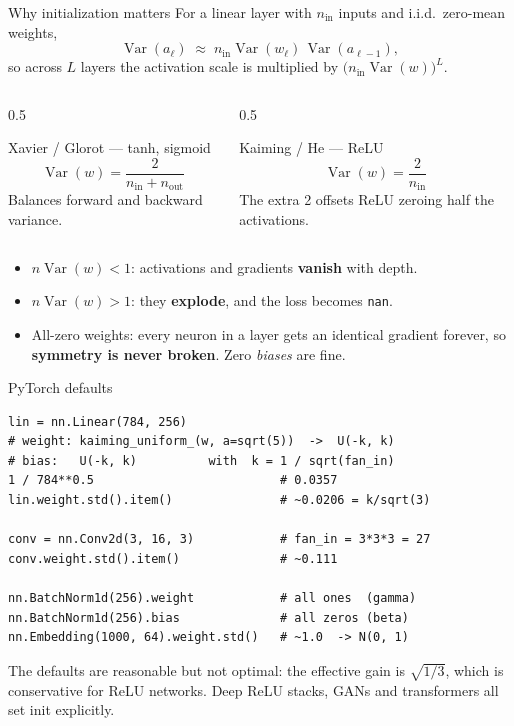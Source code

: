 \documentclass[10pt,aspectratio=169]{beamer}
\begin{document}
\begin{frame}{Why initialization matters}
For a linear layer with $n_{\text{in}}$ inputs and i.i.d.\ zero-mean weights,
\[
\operatorname{Var}(a_{\ell}) \;\approx\; n_{\text{in}} \operatorname{Var}(w_\ell)\,
\operatorname{Var}(a_{\ell-1}),
\]
so across $L$ layers the activation scale is multiplied by
$\big(n_{\text{in}}\operatorname{Var}(w)\big)^{L}$.
\vspace{0.25cm}
\begin{columns}[T]
\begin{column}{0.5\textwidth}
\begin{block}{Xavier / Glorot --- tanh, sigmoid}
\[ \operatorname{Var}(w)=\frac{2}{n_{\text{in}}+n_{\text{out}}} \]
Balances forward and backward variance.
\end{block}
\end{column}
\begin{column}{0.5\textwidth}
\begin{block}{Kaiming / He --- ReLU}
\[ \operatorname{Var}(w)=\frac{2}{n_{\text{in}}} \]
The extra 2 offsets ReLU zeroing half the activations.
\end{block}
\end{column}
\end{columns}
\vspace{0.25cm}
\begin{itemize}
    \item $n\operatorname{Var}(w)<1$: activations and gradients \textbf{vanish} with depth.
    \item $n\operatorname{Var}(w)>1$: they \textbf{explode}, and the loss becomes \texttt{nan}.
    \item All-zero weights: every neuron in a layer gets an identical gradient forever, so
          \textbf{symmetry is never broken}. Zero \emph{biases} are fine.
\end{itemize}
\end{frame}

\begin{frame}[fragile]{PyTorch defaults}
\begin{lstlisting}
lin = nn.Linear(784, 256)
# weight: kaiming_uniform_(w, a=sqrt(5))  ->  U(-k, k)
# bias:   U(-k, k)          with  k = 1 / sqrt(fan_in)
1 / 784**0.5                          # 0.0357
lin.weight.std().item()               # ~0.0206 = k/sqrt(3)

conv = nn.Conv2d(3, 16, 3)            # fan_in = 3*3*3 = 27
conv.weight.std().item()              # ~0.111

nn.BatchNorm1d(256).weight            # all ones  (gamma)
nn.BatchNorm1d(256).bias              # all zeros (beta)
nn.Embedding(1000, 64).weight.std()   # ~1.0  -> N(0, 1)
\end{lstlisting}
The defaults are reasonable but not optimal: the effective gain is $\sqrt{1/3}$, which is
conservative for ReLU networks. Deep ReLU stacks, GANs and transformers all set init
explicitly.
\end{frame}
\end{document}

